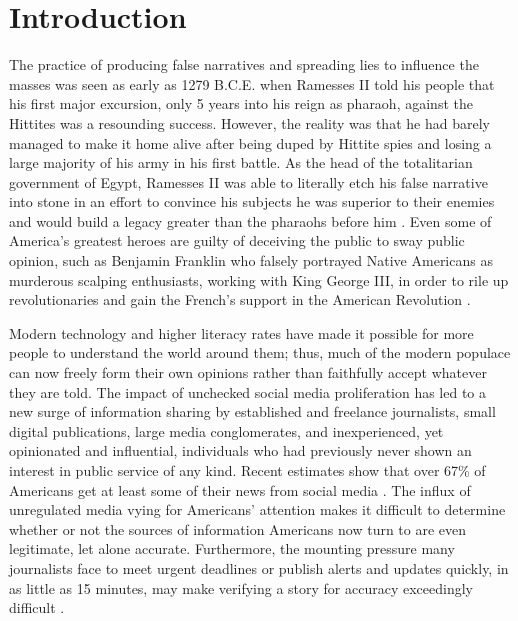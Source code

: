 \chapter{Introduction}

The practice of producing false narratives and spreading lies to influence the masses was seen as early as 1279 B.C.E. when Ramesses II told his people that his first major excursion, only 5 years into his reign as pharaoh, against the Hittites was a resounding success.  However, the reality was that he had barely managed to make it home alive after being duped by Hittite spies and losing a large majority of his army in his first battle.  As the head of the totalitarian government of Egypt, Ramesses II was able to literally etch his false narrative into stone in an effort to convince his subjects he was superior to their enemies and would build a legacy greater than the pharaohs before him \cite{weir}.  Even some of America's greatest heroes are guilty of deceiving the public to sway public opinion, such as Benjamin Franklin who falsely portrayed Native Americans as murderous scalping enthusiasts, working with King George III, in order to rile up revolutionaries and gain the French's support in the American Revolution \cite{politicoHistoryOfFakeNews}.

Modern technology and higher literacy rates have made it possible for more people to understand the world around them; thus, much of the modern populace can now freely form their own opinions rather than faithfully accept whatever they are told.  The impact of unchecked social media proliferation has led to a new surge of information sharing by established and freelance journalists, small digital publications, large media conglomerates, and inexperienced, yet opinionated and influential, individuals who had previously never shown an interest in public service of any kind.  Recent estimates show that over 67\% of Americans get at least some of their news from social media \cite{pewNewsAcrossSocialMedia}.  The influx of unregulated media vying for Americans' attention makes it difficult to determine whether or not the sources of information Americans now turn to are even legitimate, let alone accurate.  Furthermore, the mounting pressure many journalists face to meet urgent deadlines or publish alerts and updates quickly, in as little as 15 minutes, may make verifying a story for accuracy exceedingly difficult \cite{breakingNewsDrill}.

